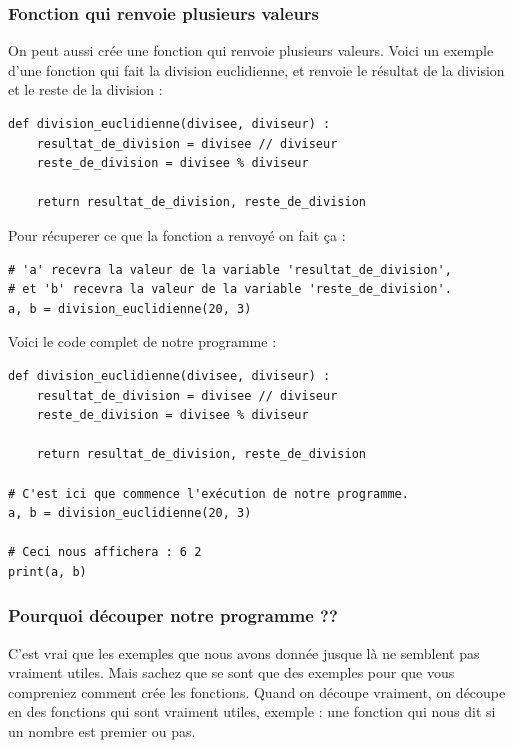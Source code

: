 \documentclass[12pt]{article}
\begin{document}
        \subsubsection{Fonction qui renvoie plusieurs valeurs}
            On peut aussi crée une fonction qui renvoie plusieurs valeurs. Voici un exemple d'une fonction qui fait
            la division euclidienne, et renvoie le résultat de la division et le reste de la division :
            \begin{lstlisting}[style=code]
def division_euclidienne(divisee, diviseur) :
    resultat_de_division = divisee // diviseur
    reste_de_division = divisee % diviseur

    return resultat_de_division, reste_de_division
            \end{lstlisting}

            Pour récuperer ce que la fonction a renvoyé on fait ça :
            \begin{lstlisting}[style=code]
# 'a' recevra la valeur de la variable 'resultat_de_division',
# et 'b' recevra la valeur de la variable 'reste_de_division'.
a, b = division_euclidienne(20, 3)
            \end{lstlisting}

            Voici le code complet de notre programme :
            \begin{lstlisting}[style=code]
def division_euclidienne(divisee, diviseur) :
    resultat_de_division = divisee // diviseur
    reste_de_division = divisee % diviseur

    return resultat_de_division, reste_de_division

# C'est ici que commence l'exécution de notre programme.
a, b = division_euclidienne(20, 3)

# Ceci nous affichera : 6 2
print(a, b)
            \end{lstlisting}

        \subsubsection{Pourquoi découper notre programme ??}
        C'est vrai que les exemples que nous avons donnée jusque là ne semblent pas vraiment utiles. Mais sachez que
        se sont que des exemples pour que vous compreniez comment crée les fonctions. Quand on découpe vraiment,
        on découpe en des fonctions qui sont vraiment utiles, exemple : une fonction qui nous dit si un nombre
        est premier ou pas.
\end{document}
